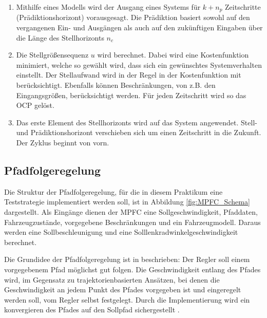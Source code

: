 \begin{enumerate}
    \item Mithilfe eines Modells wird der Ausgang eines Systems für $k+n_{p}$ Zeitschritte (Prädiktionshorizont) vorausgesagt. Die Prädiktion basiert sowohl auf den vergangenen Ein- und Ausgängen als auch auf den zukünftigen Eingaben über die Länge des Stellhorizonts $n_{c}$
    \item Die Stellgrößensequenz $u$ wird berechnet. Dabei wird eine Kostenfunktion minimiert, welche so gewählt wird, dass sich ein gewünschtes Systemverhalten einstellt. Der Stellaufwand wird in der Regel in der Kostenfunktion mit berücksichtigt. Ebenfalls können Beschränkungen, von z.B. den Eingangsgrößen, berücksichtigt werden. Für jeden Zeitschritt wird so das OCP gelöst.
    \item Das erste Element des Stellhorizonts wird auf das System angewendet. Stell- und Prädiktionshorizont verschieben sich um einen Zeitschritt in die Zukunft. Der Zyklus beginnt von vorn. 
\end{enumerate}
\subsection{Pfadfolgeregelung}

Die Struktur der Pfadfolgeregelung, für die in diesem Praktikum eine Teststrategie implementiert werden soll, ist in Abbildung \ref{fig:MPFC_Schema} dargestellt. Als Eingänge dienen der MPFC eine Sollgeschwindigkeit, Pfaddaten, Fahrzeugzustände, vorgegebene Beschränkungen und ein Fahrzeugmodell. Daraus werden eine Sollbeschleunigung und eine Solllenkradwinkelgeschwindigkeit berechnet.

Die Grundidee der Pfadfolgeregelung ist in \cite{Faulwasser2009} beschrieben: Der Regler soll einem vorgegebenem Pfad möglichst gut folgen. Die Geschwindigkeit entlang des Pfades wird, im Gegensatz zu trajektorienbasierten Ansätzen, bei denen die Geschwindigkeit an jedem Punkt des Pfades vorgegeben ist und eingeregelt werden soll, vom Regler selbst festgelegt. Durch die Implementierung wird ein konvergieren des Pfades auf den Sollpfad sichergestellt \cite{ritschel2019}.

